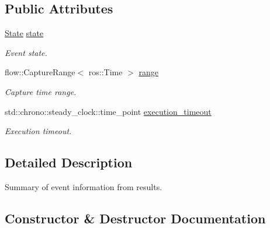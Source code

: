 \subsection*{Public Attributes}
\begin{DoxyCompactItemize}
\item 
\mbox{\label{structflow__ros_1_1_event_summary_a194fe981559bf6e9bc814742a5b36b02}} 
\hyperlink{structflow__ros_1_1_event_summary_a9b5a677b4629e3c40e36a49a3f2cea6b}{State} \hyperlink{structflow__ros_1_1_event_summary_a194fe981559bf6e9bc814742a5b36b02}{state}
\begin{DoxyCompactList}\small\item\em Event state. \end{DoxyCompactList}\item 
\mbox{\label{structflow__ros_1_1_event_summary_a2c6cd6d0c869888e4783a365b5c20c4d}} 
flow\+::\+Capture\+Range$<$ ros\+::\+Time $>$ \hyperlink{structflow__ros_1_1_event_summary_a2c6cd6d0c869888e4783a365b5c20c4d}{range}
\begin{DoxyCompactList}\small\item\em Capture time range. \end{DoxyCompactList}\item 
\mbox{\label{structflow__ros_1_1_event_summary_a18cd625e078cc5af161087134a28bd8f}} 
std\+::chrono\+::steady\+\_\+clock\+::time\+\_\+point \hyperlink{structflow__ros_1_1_event_summary_a18cd625e078cc5af161087134a28bd8f}{execution\+\_\+timeout}
\begin{DoxyCompactList}\small\item\em Execution timeout. \end{DoxyCompactList}\end{DoxyCompactItemize}


\subsection{Detailed Description}
Summary of event information from results. 

\subsection{Constructor \& Destructor Documentation}
\mbox{\label{structflow__ros_1_1_event_summary_af5403b915dc7bb690c216e445c12d655}} 
